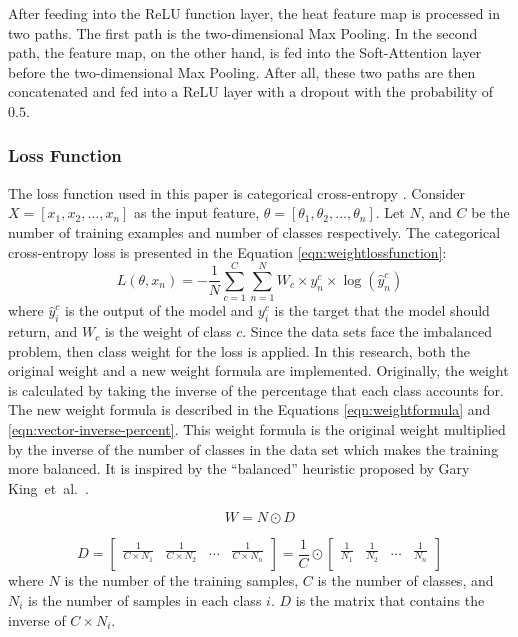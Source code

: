 \documentclass[sensors,article,accept,pdftex,moreauthors]{Definitions/mdpi}
\begin{document}
	After feeding into the ReLU function layer, the heat feature map is processed in two paths. The first path is the two-dimensional Max Pooling. In the second path, the feature map, on the other hand, is fed into the Soft-Attention layer before the two-dimensional Max Pooling. After all, these two paths are then concatenated and fed into a ReLU layer with a dropout with the probability of $0.5$.
	
	\subsubsection{Loss Function}
	The loss function used in this paper is categorical cross-entropy \hl{\mbox{\cite{8943952}}}. Consider $X = [x_1, x_2, \dots, x_n]$ as the input feature, $\theta = [\theta_1, \theta_2, \dots, \theta_n]$. Let $N$, and $C$ be the number of training examples and number of classes respectively. The categorical cross-entropy loss is presented in the Equation \eqref{eqn:weightlossfunction}:
	\begin{equation}
		\label{eqn:weightlossfunction}
		L(\theta, x_n) = -\frac{1}{N}\sum_{c=1}^{C}\sum_{n=1}^{N}W_c\times y^c_n \times \log(\hat{y}^c_n)
	\end{equation}
	where $\hat{y}^c_i$  is the output of the model and $y^c_i$ is the target that the model should return, and $W_c$ is the weight of class $c$. Since the data sets face the imbalanced problem, then class weight for the loss is applied. In this research, both the original weight and a new weight formula are implemented. Originally, the weight is calculated by taking the inverse of the percentage that each class accounts for. The new weight formula is described in the Equations \eqref{eqn:weightformula} and \eqref{eqn:vector-inverse-percent}. {This weight formula is the original weight multiplied by the inverse of the number of classes in the data set which makes the training more balanced. It is inspired by the “balanced” heuristic proposed by Gary King~et~al.~\mbox{\cite{WV006-01}}}.
	
	\begin{equation}
		\label{eqn:weightformula}
		W = N \odot D
	\end{equation}
	
	\begin{equation}
		\label{eqn:vector-inverse-percent}
		D = \begin{bmatrix}
\frac{1}{C \times  N_1} & \frac{1}{C \times  N_2} & \dots & \frac{1}{C \times  N_n}\\
		\end{bmatrix} = \frac{1}{C} \odot \begin{bmatrix}
\frac{1}{N_1} & \frac{1}{N_2} & \dots & \frac{1}{N_n}\\
		\end{bmatrix}
	\end{equation}
where $N$ is the number of the training samples, $C$ is the number of classes, and $N_i$ is the number of samples in each class $i$. $D$ is the matrix that contains the inverse of $C \times N_i$. 
	
\end{document}

